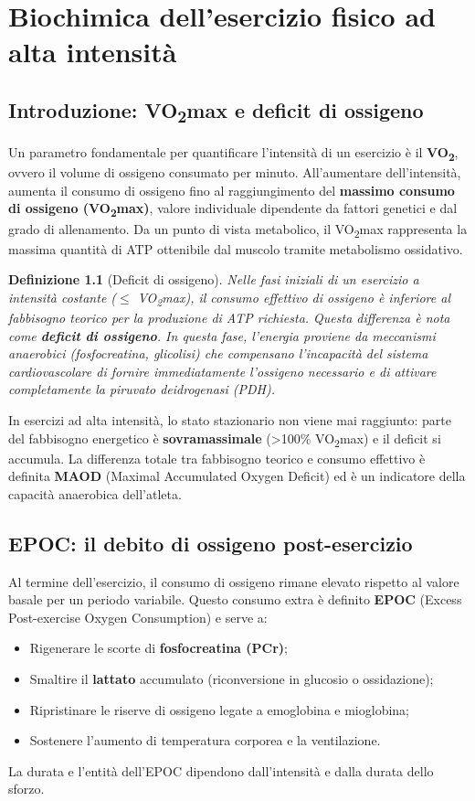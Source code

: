 \documentclass[12pt,a4paper]{report}
\newtheorem{definizione}{Definizione}[section]
\begin{document}
\chapter{Biochimica dell'esercizio fisico ad alta intensità}
\section{Introduzione: VO\textsubscript{2}max e deficit di ossigeno}
Un parametro fondamentale per quantificare l'intensità di un esercizio è il \textbf{VO\textsubscript{2}}, ovvero il volume di ossigeno consumato per minuto. All'aumentare dell'intensità, aumenta il consumo di ossigeno fino al raggiungimento del \textbf{massimo consumo di ossigeno (VO\textsubscript{2}max)}, valore individuale dipendente da fattori genetici e dal grado di allenamento. Da un punto di vista metabolico, il VO\textsubscript{2}max rappresenta la massima quantità di ATP ottenibile dal muscolo tramite metabolismo ossidativo.
\begin{definizione}[Deficit di ossigeno]
Nelle fasi iniziali di un esercizio a intensità costante ($\leq$ VO\textsubscript{2}max), il consumo effettivo di ossigeno è inferiore al fabbisogno teorico per la produzione di ATP richiesta. Questa differenza è nota come \textbf{deficit di ossigeno}. In questa fase, l'energia proviene da meccanismi anaerobici (fosfocreatina, glicolisi) che compensano l'incapacità del sistema cardiovascolare di fornire immediatamente l'ossigeno necessario e di attivare completamente la piruvato deidrogenasi (PDH).
\end{definizione}
In esercizi ad alta intensità, lo stato stazionario non viene mai raggiunto: parte del fabbisogno energetico è \textbf{sovramassimale} (>100\% VO\textsubscript{2}max) e il deficit si accumula. La differenza totale tra fabbisogno teorico e consumo effettivo è definita \textbf{MAOD} (Maximal Accumulated Oxygen Deficit) ed è un indicatore della capacità anaerobica dell'atleta.

\section{EPOC: il debito di ossigeno post-esercizio}
Al termine dell'esercizio, il consumo di ossigeno rimane elevato rispetto al valore basale per un periodo variabile. Questo consumo extra è definito \textbf{EPOC} (Excess Post-exercise Oxygen Consumption) e serve a:
\begin{itemize}
\item Rigenerare le scorte di \textbf{fosfocreatina (PCr)};
\item Smaltire il \textbf{lattato} accumulato (riconversione in glucosio o ossidazione);
\item Ripristinare le riserve di ossigeno legate a emoglobina e mioglobina;
\item Sostenere l'aumento di temperatura corporea e la ventilazione.
\end{itemize}
La durata e l'entità dell'EPOC dipendono dall'intensità e dalla durata dello sforzo.
\end{document}

